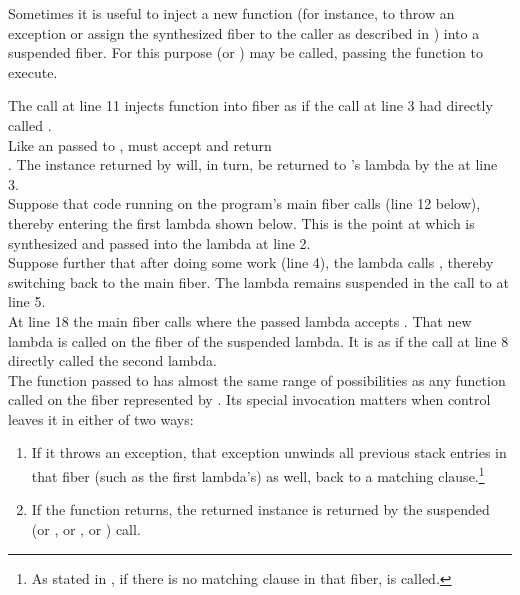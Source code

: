 \label{resumewith}
Sometimes it is useful to inject a new function (for instance, to throw an
exception or assign the synthesized fiber to the caller as described in
) into a suspended fiber. For this purpose
 (or \xtresumewith) may be called, passing the
function  to execute.

The \resumewith call at line 11 injects function  into
fiber  as if the \resume call at line 3 had directly
called .\\

Like an \entryfn\xspace passed to \fiber,  must accept
 and return\\
\fiber. The \fiber instance returned by  will, in turn, be returned
to 's lambda by the \resume at line 3.\\

Suppose that code running on the program's main fiber calls \resume (line 12 below), thereby
entering the first lambda shown below. This is the point at which  is
synthesized and passed into the lambda at line 2.\\
Suppose further that after doing some work (line 4), the lambda calls
, thereby switching back to the main fiber. The lambda remains
suspended in the call to  at line 5.\\
At line 18 the main fiber calls  where the passed lambda
accepts . That new lambda is called on the fiber of the suspended
lambda. It is as if the  call at line 8 directly called the second
lambda.\\

The function passed to \resumewith has almost the same range of possibilities as
any function called on the fiber represented by . Its special invocation
matters when control leaves it in either of two ways:

\begin{enumerate}
  \item If it throws an exception, that exception unwinds all previous stack
        entries in that fiber (such as the first lambda's) as well, back to
        a matching  clause.\footnote{As stated
        in , if there is no matching 
        clause in that fiber,  is called.}
  \item If the function returns, the returned \fiber instance is returned by
        the suspended  (or \resumewith, or \xtresume, or
        \xtresumewith) call.
\end{enumerate}

